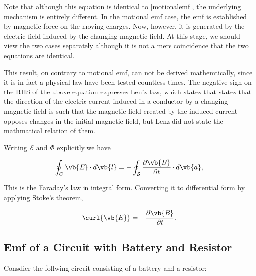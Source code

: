 \documentclass[english,a4paper,12pt]{report}
\begin{document}
Note that although this equation is identical to \cref{motionalemf}, the underlying mechanism is entirely different. In the motional emf case, the emf is established by magnetic force on the moving charges. Now, however, it is generated by the electric field induced by the changing magnetic field. At this stage, we should view the two cases separately although it is not a mere coincidence that the two equations are identical.

This result, on contrary to motional emf, can not be derived mathemtically, since it is in fact a physical law have been tested countless times. The negative sign on the RHS of the above equation expresses Len'z law, which states that states that the direction of the electric current induced in a conductor by a changing magnetic field is such that the magnetic field created by the induced current opposes changes in the initial magnetic field, but Lenz did not state the mathmatical relation of them. 

Writing \(\mathcal{E}\text { and } \Phi \) explicitly we have

\begin{equation}
    \oint_{C}\vb{E}  \cdot d \vb{l} = -\oint_{\mathcal{S}} \frac{\partial \vb{B} }{\partial t}\cdot d \vb{a} ,  
\end{equation}

This is the Faraday's law in integral form. Converting it to differential form by applying Stoke's theorem,

\begin{equation}
    \curl{\vb{E} } = -\frac{\partial \vb{B} }{\partial t}.  
\end{equation}




\subsection{Emf of a Circuit with Battery and Resistor}

Consdier the follwing circuit consisting of a battery and a resistor:
\end{document}
